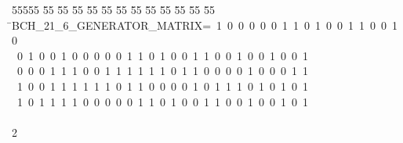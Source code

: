 %
%
\begin{tabbing}
55555 \= 55 \= 55 \= 55 \= 55 \= 55 \= 55 \= 55 \= 55 \= 55 \= 55 \= 55 \= 55 \= \>BCH\_21\_6\_GENERATOR\_MATRIX=\ 1\ 0\ 0\ 0\ 0\ 0\ 1\ 1\ 0\ 1\ 0\ 0\ 1\ 1\ 0\ 0\ 1\ 0\\[0pt]
\>\ 0\ 1\ 0\ 0\ 1\ 0\ 0\ 0\ 0\ 0\ 1\ 1\ 0\ 1\ 0\ 0\ 1\ 1\ 0\ 0\ 1\ 0\ 0\ 1\ 0\ 0\ 1\\[0pt]
\>\ 0\ 0\ 0\ 1\ 1\ 1\ 0\ 0\ 1\ 1\ 1\ 1\ 1\ 1\ 0\ 1\ 1\ 0\ 0\ 0\ 0\ 1\ 0\ 0\ 0\ 1\ 1\\[0pt]
\>\ 1\ 0\ 0\ 1\ 1\ 1\ 1\ 1\ 1\ 0\ 1\ 1\ 0\ 0\ 0\ 0\ 1\ 0\ 1\ 1\ 1\ 0\ 1\ 0\ 1\ 0\ 1\\[0pt]
\>\ 1\ 0\ 1\ 1\ 1\ 1\ 0\ 0\ 0\ 0\ 0\ 1\ 1\ 0\ 1\ 0\ 0\ 1\ 1\ 0\ 0\ 1\ 0\ 0\ 1\ 0\ 1\ \\[0pt]
\>\\[0pt]
2\>\end{tabbing}
